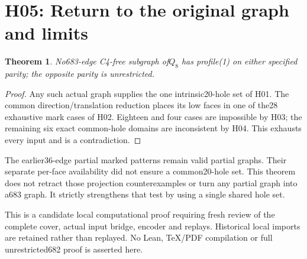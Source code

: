 \documentclass{article}
\newtheorem{theorem}{Theorem}
\begin{document}
\section{H05: Return to the original graph and limits}
\begin{theorem}
No683-edge C4-free subgraph of$Q_8$ has profile(1) on either specified
parity; the opposite parity is unrestricted.
\end{theorem}
\begin{proof}
Any such actual graph supplies the one intrinsic20-hole set of H01.
The common direction/translation reduction places its low faces in
one of the28 exhaustive mark cases of H02. Eighteen and four cases
are impossible by H03; the remaining six exact common-hole domains
are inconsistent by H04. This exhausts every input and is a
contradiction.
\end{proof}
The earlier36-edge partial marked patterns remain valid partial graphs.
Their separate per-face availability did not ensure a common20-hole
set. This theorem does not retract those projection counterexamples or
turn any partial graph into a683 graph. It strictly strengthens that
test by using a single shared hole set.

This is a candidate local computational proof requiring fresh review
of the complete cover, actual input bridge, encoder and replays.
Historical local imports are retained rather than replayed. No Lean,
TeX/PDF compilation or full unrestricted682 proof is asserted here.
\end{document}
